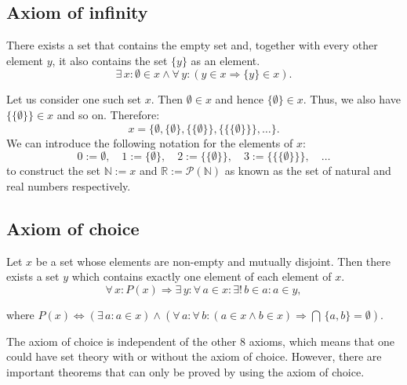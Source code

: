 \documentclass[root.tex]{subfiles}
\begin{document}
%

\subsection{Axiom of infinity}
There exists a set that contains the empty set and,  together with every other element $y$, it also contains the set $\{y\}$ as an element.
$$
\exists \, x : \emptyset \in x \land \forall \, y : (y\in x \Rightarrow \{y\} \in x).
$$

\begin{corollary}
Let us consider one such set $x$. Then $\emptyset \in x$ and hence $\{\emptyset\}\in x$. Thus, we also have $\{\{\emptyset\}\}\in x$ and so on. Therefore:
$$
x = \{\emptyset,\{\emptyset\},\{\{\emptyset\}\},\{\{\{\emptyset\}\}\},\ldots\}.
$$
We can introduce the following notation for the elements of $x$:
$$
0 :=\emptyset , \quad 1  := \{\emptyset\},\quad 2:= \{\{\emptyset\}\}, \quad 3:= \{\{\{\emptyset\}\}\} , \quad \ldots
$$
to construct the set $\mathbb{N}:=x$ and $\mathbb{R}:= \mathcal{P}(\mathbb{N})$ as known as the set of natural and real numbers respectively.
\end{corollary}

\subsection{Axiom of choice}
Let $x$ be a set whose elements are non-empty and mutually disjoint. Then there exists a set $y$ which contains exactly one element of each element of $x$.
$$
\forall \, x : P(x) \Rightarrow \exists \, y : \forall \, a \in x :\exists! \, b \in a : a \in y,
$$

where $P(x) \Leftrightarrow (\exists \,a : a \in x) \land (\forall \, a : \forall \, b : (a\in x \land b \in x) \Rightarrow \bigcap \, \{a,b\} = \emptyset )$.

\begin{remark}
The axiom of choice is independent of the other 8 axioms, which means that one could have set theory with or without the axiom of choice. However, there are important theorems that can only be proved by using the axiom of choice. 
\end{remark}
\end{document}
